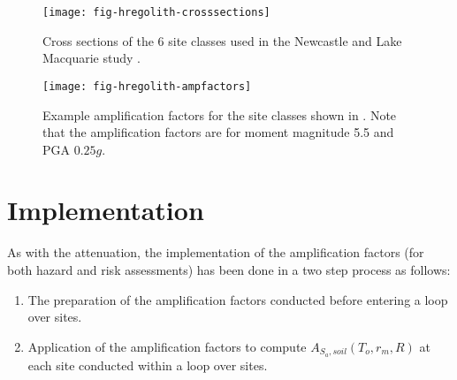 \begin{figure}
\begin{center}
\texttt{[image: fig-hregolith-crosssections]}
\end{center}
\caption{Cross sections of the 6 site classes used in the
Newcastle and Lake Macquarie study \citep{dr_Dhu02b}. }
\label{fig:regolith-newcexample-crosssection}
\end{figure}

\begin{figure}
\begin{center}
\texttt{[image: fig-hregolith-ampfactors]}
\end{center}
\caption{Example amplification factors for the site classes shown
in . Note that the
amplification factors are for moment magnitude 5.5 and PGA
$0.25g$. } \label{fig:regolith-newcexample-ampfactors}
\end{figure}


\section{Implementation}

As with the attenuation, the implementation of the amplification
factors (for both hazard and risk assessments) has been done in a
two step process as follows:
\begin{enumerate}
\item The preparation of the amplification factors
conducted before entering a loop over sites. \item Application of
the amplification factors to compute $A_{S_a,soil}(T_o,r_m,R)$ at
each site conducted within a loop over sites.
\end{enumerate}


